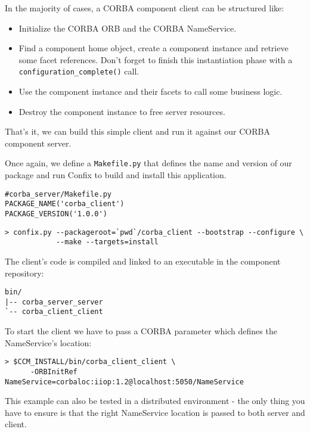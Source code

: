 In the majority of cases, a CORBA component client can be structured like:
\begin{itemize}
\item Initialize the CORBA ORB and the CORBA NameService.

\item Find a component home object, create a component instance and retrieve 
some facet references. Don't forget to finish this instantiation phase with a
{\tt configuration\_complete()} call.

\item Use the component instance and their facets to call some business
logic.

\item Destroy the component instance to free server resources.
\end{itemize} 

That's it, we can build this simple client and run it against our CORBA
component server.

Once again, we define a {\tt Makefile.py} that defines the name and version
of our package and run Confix to build and install this application.
\begin{small}
\begin{verbatim}
#corba_server/Makefile.py
PACKAGE_NAME('corba_client')
PACKAGE_VERSION('1.0.0')
\end{verbatim}
\end{small}

\begin{small}
\begin{verbatim}
> confix.py --packageroot=`pwd`/corba_client --bootstrap --configure \
            --make --targets=install
\end{verbatim}
\end{small}

The client's code is compiled and linked to an executable in the
component repository:
\begin{small}
\begin{verbatim}
bin/
|-- corba_server_server
`-- corba_client_client
\end{verbatim}
\end{small}

To start the client we have to pass a CORBA parameter which defines 
the NameService's location:

\begin{small}
\begin{verbatim}
> $CCM_INSTALL/bin/corba_client_client \
      -ORBInitRef NameService=corbaloc:iiop:1.2@localhost:5050/NameService
\end{verbatim}
\end{small}

This example can also be tested in a distributed environment - the only thing
you have to ensure is that the right NameService location is passed to both
server and client.


